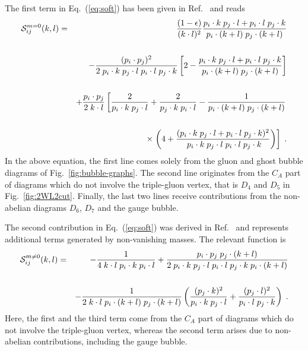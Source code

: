 \documentclass[a4paper,11pt]{article}
\numberwithin{equation}{section}
\begin{document}
%
The first term in Eq.~(\ref{eq:soft}) has been given in
Ref.~\cite{Catani:1999ss} and reads
%
\begin{eqnarray}
{\cal S}^{m=0}_{ij}(k,l) &=& \frac{(1-\epsilon)}{(k \cdot l)^2}
\frac{p_i \cdot k \; p_j \cdot l + p_i \cdot l \; p_j \cdot
  k}{p_i \cdot (k+l) \; p_j \cdot (k+l)} \nonumber
\\ \nonumber \\
&& - \frac{(p_i \cdot p_j)^2}{2 \; p_i \cdot k \; p_j \cdot l \; p_i
  \cdot l \; p_j \cdot k} \left[ 2 - \frac{p_i \cdot k \; p_j
    \cdot l + p_i \cdot l \; p_j \cdot k}{p_i \cdot (k+l) \;
    p_j \cdot (k+l)} \right] \nonumber \\  \nonumber \\
&& + \frac{p_i \cdot p_j}{2 \; k \cdot l} \left[ \frac{2}{p_i
    \cdot k \; p_j \cdot l} + \frac{2}{p_j \cdot k \; p_i \cdot
    l} - \frac{1}{p_i \cdot (k+l) \; p_j \cdot (k+l)}
  \right. \nonumber \\ \nonumber \\
&& \times \left. \left( 4 + \frac{(p_i \cdot k \; p_j \cdot l +
    p_i \cdot l \; p_j \cdot k)^2}{\; p_i \cdot k \; p_j \cdot
    l \; p_i \cdot l \; p_j \cdot k} \right) \right] \; .
    \label{eq:Smassless}
\end{eqnarray}
%
In the above equation, the first line comes solely from the gluon and ghost
bubble diagrams of Fig.~\ref{fig:bubble-graphs}. The second line originates from
the $C_A$ part of diagrams which do not involve the triple-gluon vertex, that
is $D_4$ and $D_5$ in Fig.~\ref{fig:2WL2cut}. Finally, the last two lines
receive contributions from the non-abelian diagrams $D_6$, $D_7$ and the gauge
bubble.

The second contribution in Eq.~(\ref{eq:soft}) was derived in
Ref.~\cite{Czakon:2011ve} and represents additional terms generated by
non-vanishing masses. The relevant function is
%
\begin{eqnarray}
  {\cal S}^{m\neq0}_{ij}(k,l) &=
  &  - \frac{1}{4  \; k \cdot l \; p_i \cdot
  k \; p_i \cdot l} + \frac{p_i \cdot p_j \; p_j
  \cdot (k+l)}{2 \; p_i \cdot k \; p_j \cdot l \; p_i \cdot l \;
    p_j \cdot k \; p_i \cdot (k+l)} \nonumber \\ \nonumber \\
  && - \frac{1}{2 \; k \cdot l \; p_i \cdot (k+l) \; p_j \cdot
    (k+l) } \left( \frac{(p_j \cdot k)^2}{p_i \cdot k \; p_j
    \cdot l} + \frac{(p_j \cdot l)^2}{p_i \cdot l \; p_j \cdot
    k} \right) \; . \nonumber \\
    \label{eq:Smassive}
\end{eqnarray}
%
Here, the first and the third term come from the $C_A$ part of diagrams
which do not involve the triple-gluon vertex, whereas the second term arises due to
non-abelian contributions, including the gauge bubble.
\end{document}
